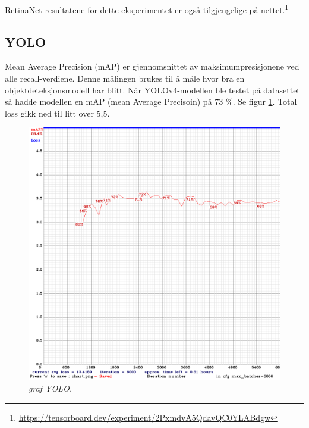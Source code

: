 RetinaNet-resultatene for dette eksperimentet er også tilgjengelige på nettet.\footnote{\url{https://tensorboard.dev/experiment/2PxmdvA5QdavQC0YLABdgw}}

\subsection{YOLO}

Mean Average Precision (mAP) er gjennomsnittet av maksimumpresisjonene ved alle recall-verdiene. Denne målingen brukes til å måle hvor bra en objektdeteksjonsmodell har blitt. Når YOLOv4-modellen ble testet på datasettet så hadde modellen en mAP (mean Average Precisoin) på 73 \%. Se figur \ref{fig:chart_yolo}. Total loss gikk ned til litt over 5,5. %


\begin{figure}[h!]
\begin{center} 
\includegraphics[scale=0.35]{figures/chart_yolo-obj.png}
\caption{\small \sl graf YOLO. \label{fig:chart_yolo}}
\end{center}
\end{figure}